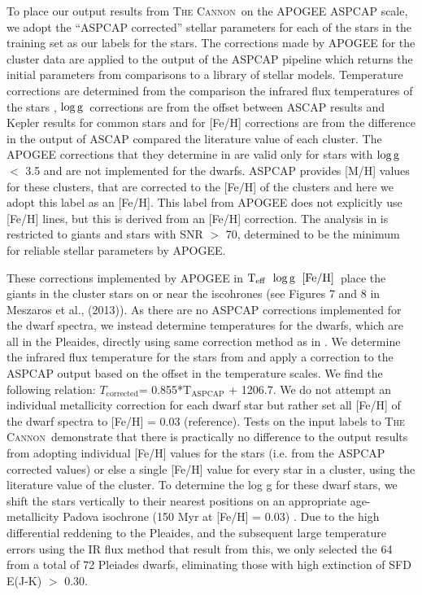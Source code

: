 \documentclass[12pt, preprint]{aastex}
\newcommand{\teff}{\mbox{$\rm T_{eff}$}}
\newcommand{\feh}{\mbox{$\rm [Fe/H]$}}
\newcommand{\logg}{\mbox{$\rm \log g$}}
\newcommand{\tc}{\textsc{The Cannon}}
\begin{document}

To place our output results from \tc\ on the APOGEE ASPCAP scale, we adopt the ``ASPCAP corrected'' stellar parameters for each of the stars in the training set as our labels for the stars. The corrections made by APOGEE for the cluster data are applied to the output of the ASPCAP pipeline which returns the initial parameters from comparisons to a library of stellar models. Temperature corrections are determined from the comparison the infrared flux temperatures of the stars \citep{Gonzalez2009}, \logg\ corrections are from the offset between ASCAP results and Kepler results for common stars and for [Fe/H] corrections are from the difference in the output of ASCAP compared the literature value of each cluster.  The APOGEE corrections that they determine in \citet{Meszaros2013} are valid only for stars with \logg\ $<$ 3.5 and are not implemented for the dwarfs. ASPCAP provides [M/H] values for these clusters, that are corrected to the [Fe/H] of the clusters and here we adopt this label as an [Fe/H]. This label from APOGEE does not explicitly use [Fe/H] lines, but this is derived from an [Fe/H] correction. The analysis in \citet{Meszaros2013} is restricted to giants and stars with SNR $>$ 70, determined to be the minimum for reliable stellar parameters by APOGEE. 

These corrections implemented by APOGEE in \teff\, \logg\, \feh\ place the giants in the cluster stars on or near the iscohrones (see Figures 7 and 8 in Meszaros et al., (2013)).  As there are no ASPCAP corrections implemented for the dwarf spectra, we instead determine temperatures for the dwarfs, which are all in the Pleaides, directly using same correction method as in \citet{Meszaros2013}. We determine the infrared flux temperature for the stars from \citep{Gonzalez2009} and apply a correction to the ASPCAP output based on the offset in the temperature scales. We find the following relation: $T_{\mbox{corrected}}$= 0.855*T$_{\mbox{ASPCAP}}$ + 1206.7. We do not attempt an individual metallicity correction for each dwarf star but rather set all [Fe/H] of the dwarf spectra to [Fe/H] = 0.03 (reference). Tests on the input labels to \tc\ demonstrate that there is practically no difference to the output results from adopting individual [Fe/H] values for the stars (i.e. from the ASPCAP corrected values) or else a single [Fe/H] value for every star in a cluster, using the literature value of the cluster. To determine the log g for these dwarf stars, we shift the stars vertically to their nearest positions on an appropriate age-metallicity Padova isochrone (150 Myr at [Fe/H] = 0.03) \citep{Girardi2010}. Due to the high differential reddening to the Pleaides, and the subsequent large temperature errors using the IR flux method that result from this, we only selected the 64 from a total of 72 Pleiades dwarfs, eliminating those with high extinction of SFD E(J-K) $>$ 0.30.
\end{document}
